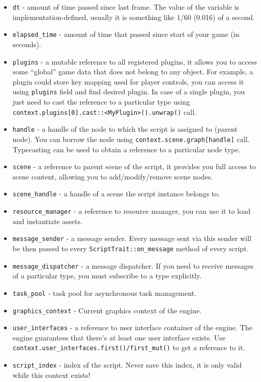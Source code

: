 \documentclass[
]{book}
\providecommand{\tightlist}{%
  \setlength{\itemsep}{0pt}\setlength{\parskip}{0pt}}
\theoremstyle{definition}
\theoremstyle{definition}
\theoremstyle{definition}
\theoremstyle{definition}
\theoremstyle{remark}
\begin{document}
\begin{itemize}
\tightlist
\item
  \texttt{dt} - amount of time passed since last frame. The value of the variable is implementation-defined, usually it is something like 1/60 (0.016) of a second.
\item
  \texttt{elapsed\_time} - amount of time that passed since start of your game (in seconds).
\item
  \texttt{plugins} - a mutable reference to all registered plugins, it allows you to access some ``global'' game data that does not belong to any object. For example, a plugin could store key mapping used for player controls, you can access it using \texttt{plugins} field and find desired plugin. In case of a single plugin, you just need to cast the reference to a particular type using \texttt{context.plugins{[}0{]}.cast::\textless{}MyPlugin\textgreater{}().unwrap()} call.
\item
  \texttt{handle} - a handle of the node to which the script is assigned to (parent node). You can borrow the node using
  \texttt{context.scene.graph{[}handle{]}} call. Typecasting can be used to obtain a reference to a particular node type.
\item
  \texttt{scene} - a reference to parent scene of the script, it provides you full access to scene content, allowing you to add/modify/remove scene nodes.
\item
  \texttt{scene\_handle} - a handle of a scene the script instance belongs to.
\item
  \texttt{resource\_manager} - a reference to resource manager, you can use it to load and instantiate assets.
\item
  \texttt{message\_sender} - a message sender. Every message sent via this sender will be then passed to every
  \texttt{ScriptTrait::on\_message} method of every script.
\item
  \texttt{message\_dispatcher} - a message dispatcher. If you need to receive messages of a particular type, you must subscribe to a type explicitly.
\item
  \texttt{task\_pool} - task pool for asynchronous task management.
\item
  \texttt{graphics\_context} - Current graphics context of the engine.
\item
  \texttt{user\_interfaces} - a reference to user interface container of the engine. The engine guarantees that there's at least one user interface exists. Use \texttt{context.user\_interfaces.first()/first\_mut()} to get a reference to it.
\item
  \texttt{script\_index} - index of the script. Never save this index, it is only valid while this context exists!
\end{itemize}
\end{document}
